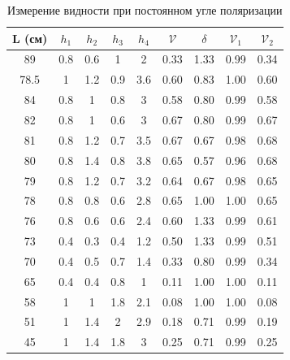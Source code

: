 \documentclass[a4paper]{article}
\begin{document}
\begin{longtable}[c]{|c|c|c|c|c|c|c|c|c|}
\caption{Измерение видности при постоянном угле поляризации}
\label{t2}\\
\hline
L (см) & $h_1$ & $h_2$ & $h_3$ & $h_4$ & $\mathcal{V}$ & $\delta$ & $\mathcal{V}_1$ & $\mathcal{V}_2$ \\ \hline
\endfirsthead
%
\endhead
%
89     & 0.8   & 0.6   & 1     & 2     & 0.33          & 1.33     & 0.99            & 0.34            \\ \hline
78.5   & 1     & 1.2   & 0.9   & 3.6   & 0.60          & 0.83     & 1.00            & 0.60            \\ \hline
84     & 0.8   & 1     & 0.8   & 3     & 0.58          & 0.80     & 0.99            & 0.58            \\ \hline
82     & 0.8   & 1     & 0.6   & 3     & 0.67          & 0.80     & 0.99            & 0.67            \\ \hline
81     & 0.8   & 1.2   & 0.7   & 3.5   & 0.67          & 0.67     & 0.98            & 0.68            \\ \hline
80     & 0.8   & 1.4   & 0.8   & 3.8   & 0.65          & 0.57     & 0.96            & 0.68            \\ \hline
79     & 0.8   & 1.2   & 0.7   & 3.2   & 0.64          & 0.67     & 0.98            & 0.65            \\ \hline
78     & 0.8   & 0.8   & 0.6   & 2.8   & 0.65          & 1.00     & 1.00            & 0.65            \\ \hline
76     & 0.8   & 0.6   & 0.6   & 2.4   & 0.60          & 1.33     & 0.99            & 0.61            \\ \hline
73     & 0.4   & 0.3   & 0.4   & 1.2   & 0.50          & 1.33     & 0.99            & 0.51            \\ \hline
70     & 0.4   & 0.5   & 0.7   & 1.4   & 0.33          & 0.80     & 0.99            & 0.34            \\ \hline
65     & 0.4   & 0.4   & 0.8   & 1     & 0.11          & 1.00     & 1.00            & 0.11            \\ \hline
58     & 1     & 1     & 1.8   & 2.1   & 0.08          & 1.00     & 1.00            & 0.08            \\ \hline
51     & 1     & 1.4   & 2     & 2.9   & 0.18          & 0.71     & 0.99            & 0.19            \\ \hline
45     & 1     & 1.4   & 1.8   & 3     & 0.25          & 0.71     & 0.99            & 0.25            \\ \hline

\end{longtable}
\end{document}
